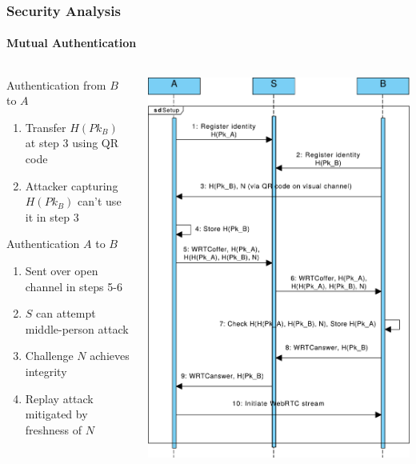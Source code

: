 \documentclass[handout, notes=hide]{beamer}
\begin{document}
\begin{frame}
\frametitle{Security Analysis}
\framesubtitle{Mutual Authentication}

\begin{columns}[T]
\begin{column}[T]{0.6\textwidth}

Authentication from $B$ to $A$
\begin{enumerate}
\item Transfer $H(Pk_B)$ at step 3 using QR code
\item Attacker capturing $H(Pk_B)$ can't use it in step 3
\end{enumerate}

Authentication $A$ to $B$
\begin{enumerate}
\item Sent over open channel in steps 5-6
\item $S$ can attempt middle-person attack
\item Challenge $N$ achieves integrity
\item Replay attack mitigated by freshness of $N$
\end{enumerate}


\end{column}
\begin{column}[T]{0.4\textwidth}
\includegraphics[width=1.0\textwidth]{core-qr-thin}
\end{column}
\end{columns}

\end{frame}
\end{document}
